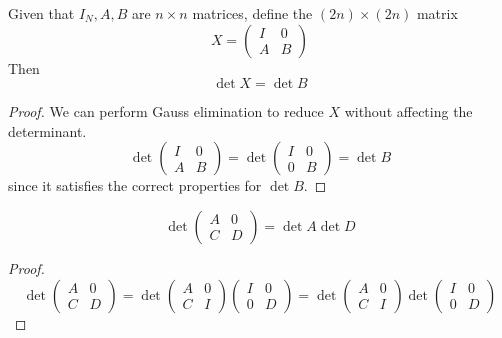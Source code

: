   \begin{theorem}
    Given that $I_N, A, B$ are $n \times n$ matrices, define the $(2n) \times (2n)$ matrix 
    \begin{equation}
      X = \begin{pmatrix} I & 0 \\ A & B \end{pmatrix}
    \end{equation}
    Then 
    \begin{equation}
      \det{X} = \det{B}
    \end{equation}
  \end{theorem}
  \begin{proof}
    We can perform Gauss elimination to reduce $X$ without affecting the determinant.
    \begin{equation}
      \det{\begin{pmatrix} I&0\\A&B \end{pmatrix}} = \det{ \begin{pmatrix} I&0\\ 0&B \end{pmatrix}} = \det{B}
    \end{equation}
    since it satisfies the correct properties for $\det{B}$. 
  \end{proof}

  \begin{corollary}
    \begin{equation}
      \det{\begin{pmatrix} A&0\\C&D \end{pmatrix}} = \det{A} \det{D}
    \end{equation}
  \end{corollary}
  \begin{proof}
    \begin{equation}
      \det{\begin{pmatrix}
      A&0\\C&D 
      \end{pmatrix}} = \det{\begin{pmatrix}
      A&0\\C&I
      \end{pmatrix} \begin{pmatrix}
      I&0\\0&D
      \end{pmatrix}} = \det{\begin{pmatrix}
      A&0\\C&I
      \end{pmatrix}} \det{\begin{pmatrix}
      I&0\\0&D
      \end{pmatrix}}
    \end{equation}
  \end{proof}

